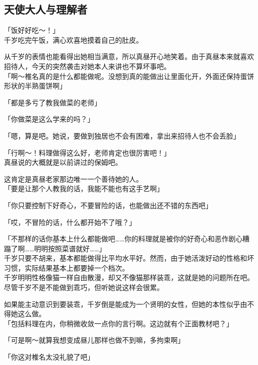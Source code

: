 \subsection{天使大人与理解者}

「饭好好吃～！」\\

千岁吃完午饭，满心欢喜地摸着自己的肚皮。

从千岁的表情也能看得出她相当满意，所以真昼开心地笑着。由于真昼本来就喜欢招待人，今天的突然袭击对她本人来讲也不算坏事吧。\\

「啊～椎名真的是什么都能做呢。没想到真的能做出让里面化开，外面还保持蛋饼形状的半熟蛋饼啊」

「都是多亏了教我做菜的老师」

「你做菜是这么学来的吗？」%

「嗯，算是吧。她说，要做到独居也不会有困难，拿出来招待人也不会丢脸」

「行啊～！料理做得这么好，老师肯定也很厉害吧！」\\

真昼说的大概就是以前讲过的保姆吧。

这肯定是真昼老家那边唯一一个善待她的人。\\

「要是让那个人教我的话，我能不能也有这手艺啊」

「你只要控制下好奇心，不要冒险的话，也能做出还不错的东西吧」

「哎，不冒险的话，什么都开始不了哦？」

「不那样的话你基本上什么都能做吧……你的料理就是被你的好奇心和恶作剧心糟蹋了啊……明明按照菜谱就好……」\\

千岁只要不胡来，基本都能做得比平均水平好。然而，由于她活泼好动的性格和坏习惯，实际结果基本上都要掉一个档次。\\

千岁明明性格像猫一样自由散漫，却又不像猫那样装乖，这就是她的问题所在吧。尽管千岁不是不能做到乖巧，但听她说这样会很累。

如果能主动意识到要装乖，千岁倒是能成为一个贤明的女性，但她的本性似乎由不得她这么做。\\%

「包括料理在内，你稍微收敛一点你的言行啊。这边就有个正面教材吧？」

「可是啊～就算我想变成昼儿那样也做不到嘛，多拘束啊」

「你这对椎名太没礼貌了吧」

